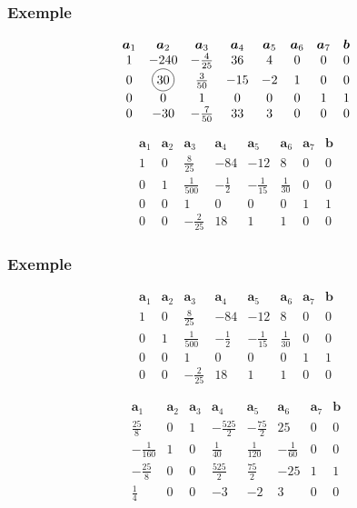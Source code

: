 \documentclass[t,usepdftitle=false]{beamer}
\newcommand*\circled[1]{\tikz[baseline=(char.base)]{
    \node[shape=circle,draw,inner sep=2pt] (char) {#1};}}
\def\ba{\boldsymbol{a}}
\def\bb{\boldsymbol{b}}
\begin{document}
\begin{frame}
	\frametitle{Exemple}
	
	\[
	\begin{matrix}
		\ba_1 & \ba_2 & \ba_3 & \ba_4 & \ba_5 &\ba_6 &\ba_7 & \bb \\
		1 & -240 & -\frac{4}{25} & 36 & 4 & 0 & 0 & 0 \\
		0 & \circled{30} & \frac{3}{50} & -15 & -2 & 1 & 0 & 0 \\
		0 & 0 & 1 & 0 & 0 & 0 & 1 & 1 \\
		0 & -30 & -\frac{7}{50} & 33 & 3 & 0 & 0 & 0
	\end{matrix}
	\]
	
	\[
	\begin{matrix}
		\ba_1 & \ba_2 & \ba_3 & \ba_4 & \ba_5 &\ba_6 &\ba_7 & \bb \\
		1 & 0 & \frac{8}{25} & -84 & -12 & 8 & 0 & 0 \\
		0 & 1 & \frac{1}{500} & -\frac{1}{2} & -\frac{1}{15} & \frac{1}{30} & 0 & 0 \\
		0 & 0 & 1 & 0 & 0 & 0 & 1 & 1 \\
		0 & 0 & -\frac{2}{25} & 18 & 1 & 1 & 0 & 0
	\end{matrix}
	\]
	
\end{frame}

\begin{frame}
	\frametitle{Exemple}
	
	\[
	\begin{matrix}
		\ba_1 & \ba_2 & \ba_3 & \ba_4 & \ba_5 &\ba_6 &\ba_7 & \bb \\
		1 & 0 & \frac{8}{25} & -84 & -12 & 8 & 0 & 0 \\
		0 & 1 & \frac{1}{500} & -\frac{1}{2} & -\frac{1}{15} & \frac{1}{30} & 0 & 0 \\
		0 & 0 & 1 & 0 & 0 & 0 & 1 & 1 \\
		0 & 0 & -\frac{2}{25} & 18 & 1 & 1 & 0 & 0
	\end{matrix}
	\]
	
	\[
	\begin{matrix}
		\ba_1 & \ba_2 & \ba_3 & \ba_4 & \ba_5 &\ba_6 &\ba_7 & \bb \\
		\frac{25}{8} & 0 & 1 & -\frac{525}{2} & -\frac{75}{2} & 25 & 0 & 0 \\
		-\frac{1}{160} & 1 & 0 & \frac{1}{40} & \frac{1}{120} & -\frac{1}{60} & 0 & 0 \\
		-\frac{25}{8} & 0 & 0 & \frac{525}{2} & \frac{75}{2} & -25 & 1 & 1 \\
		\frac{1}{4} & 0 & 0 & -3 & -2 & 3 & 0 & 0
	\end{matrix}
	\]
	
\end{frame}
\end{document}
